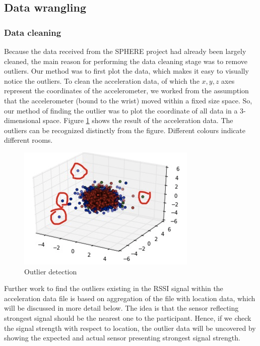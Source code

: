 \documentclass[fleqn,10pt]{SelfArx} %
\begin{document}
	\subsection{Data wrangling}
\subsubsection{Data cleaning}
Because the data received from the SPHERE project had already been largely cleaned, the main reason for performing the data cleaning stage was to remove outliers. Our method was to first plot the data, which makes it easy to visually notice the outliers. To clean the acceleration data, of which the $ x, y, z $ axes represent the coordinates of the accelerometer, we worked from the assumption that the accelerometer (bound to the wrist) moved within a fixed size space. So, our method of finding the outlier was to plot the coordinate of all data in a 3-dimensional space. Figure \ref{fig:outliers} shows the result of the acceleration data. The outliers can be recognized distinctly from the figure. Different colours indicate different rooms. \\

\begin{figure}[!h] \centering
	\includegraphics[scale=0.5]{outliers} 
	\caption{Outlier detection}
	\label{fig:outliers}
\end{figure}

Further work to find the outliers existing in the RSSI signal within the acceleration data file is based on aggregation of the file with location data, which will be discussed in more detail below. The idea is that the sensor reflecting strongest signal should be the nearest one to the participant. Hence, if we check the signal strength with respect to location, the outlier data will be uncovered by showing the expected and actual sensor presenting strongest signal strength. \\
\end{document}
